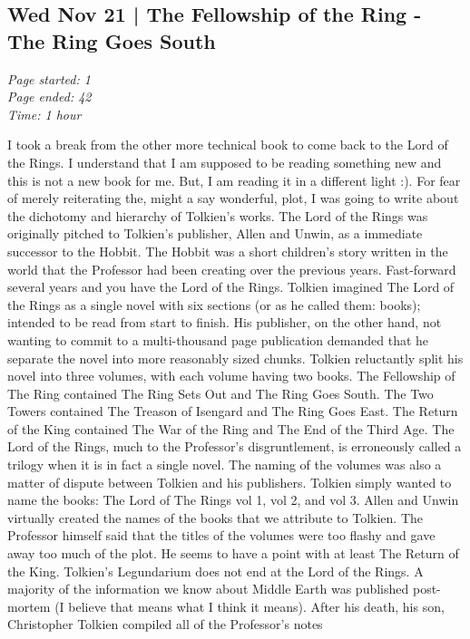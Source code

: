 \documentclass{article}
\begin{document}
\subsection{Wed Nov 21 | The Fellowship of the Ring - The Ring Goes South}
\textit{Page started: 1 \\
        Page ended: 42 \\
        Time: 1 hour \\
}

I took a break from the other more technical book to come back to the Lord of
the Rings. I understand that I am supposed to be reading something new and this
is not a new book for me. But, I am reading it in a different light :). For
fear of merely reiterating the, might a say wonderful, plot, I was going to
write about the dichotomy and hierarchy of Tolkien's works. The Lord of the
Rings was originally pitched to Tolkien's publisher, Allen and Unwin, as a
immediate successor to the Hobbit. The Hobbit was a short children's story
written in the world that the Professor had been creating over the previous
years. Fast-forward several years and you have the Lord of the Rings. Tolkien
imagined The Lord of the Rings as a single novel with six sections (or as he
called them: books); intended to be read from start to finish. His publisher,
on the other hand, not wanting to commit to a multi-thousand page publication
demanded that he separate the novel into more reasonably sized chunks. Tolkien
reluctantly split his novel into three volumes, with each volume having two
books. The Fellowship of The Ring contained The Ring Sets Out and The Ring Goes
South. The Two Towers contained The Treason of Isengard and The Ring Goes East.
The Return of the King contained The War of the Ring and The End of the Third
Age. The Lord of the Rings, much to the Professor's disgruntlement, is
erroneously called a trilogy when it is in fact a single novel. The naming of
the volumes was also a matter of dispute between Tolkien and his publishers.
Tolkien simply wanted to name the books: The Lord of The Rings vol 1, vol 2,
and vol 3. Allen and Unwin virtually created the names of the books that we
attribute to Tolkien. The Professor himself said that the titles of the volumes
were too flashy and gave away too much of the plot. He seems to have a point
with at least The Return of the King. Tolkien's Legundarium does not end at
the Lord of the Rings. A majority of the information we know about Middle Earth
was published post-mortem (I believe that means what I think it means). After
his death, his son, Christopher Tolkien compiled all of the Professor's notes
\end{document}
